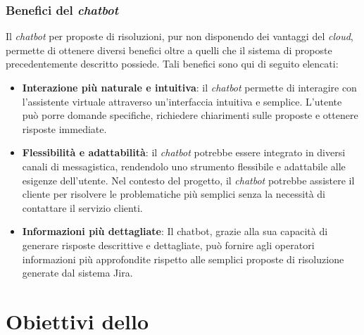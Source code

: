 \subsubsection{Benefici del \textit{chatbot}}
Il \textit{chatbot} per proposte di risoluzioni,  pur non disponendo dei vantaggi del \textit{cloud}, permette di ottenere diversi benefici oltre a quelli che il sistema di proposte precedentemente descritto possiede. Tali benefici sono qui di seguito elencati:
\begin{itemize}
    \item \textbf{Interazione più naturale e intuitiva}: il \textit{chatbot} permette di interagire con l'assistente virtuale attraverso un'interfaccia intuitiva e semplice. L'utente può porre domande specifiche, richiedere chiarimenti sulle proposte e ottenere risposte immediate.
    \item \textbf{Flessibilità e adattabilità}: il \textit{chatbot} potrebbe essere integrato in diversi canali di messagistica, rendendolo uno strumento flessibile e adattabile alle esigenze dell'utente. Nel contesto del progetto, il \textit{chatbot} potrebbe assistere il cliente per risolvere le problematiche più semplici senza la necessità di contattare il servizio clienti.
    \item \textbf{Informazioni più dettagliate}: Il chatbot, grazie alla sua capacità di generare risposte descrittive e dettagliate, può fornire agli operatori informazioni più approfondite rispetto alle semplici proposte di risoluzione generate dal sistema Jira.
\end{itemize}

\section{Obiettivi dello} \label{sec:obiettiviStage}
